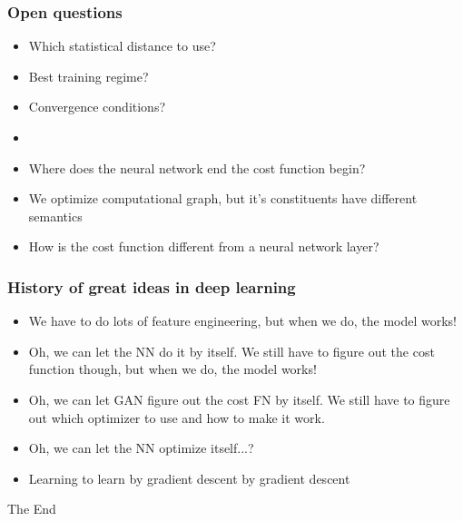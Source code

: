 \documentclass{beamer}
\begin{document}
\begin{frame}
	\frametitle{Open questions}
	\begin{itemize}
		\item Which statistical distance to use?
		\item Best training regime?
		\item Convergence conditions?
		\item 
		\item Where does the neural network end the cost function begin?
		\item We optimize computational graph, but it's constituents have different semantics
		\item How is the cost function different from a neural network layer?
	\end{itemize}
\end{frame}

\begin{frame}
\frametitle{History of great ideas in deep learning}

\begin{itemize}
	\item We have to do lots of feature engineering, but when we do, the model works!
	\item Oh, we can let the NN do it by itself. We still have to figure out the cost function though, but when we do, the model works!
	\item Oh, we can let GAN figure out the cost FN by itself. We still have to figure out which optimizer to use and how to make it work.
	\item Oh, we can let the NN optimize itself...?
	\item Learning to learn by gradient descent by gradient descent
\end{itemize}

\end{frame}



\begin{frame}
\Huge{\centerline{The End}}
\end{frame}

\end{document}
